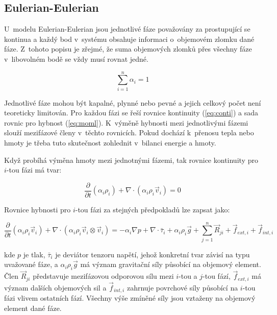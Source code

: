 \subsection{Eulerian-Eulerian}
U~modelu Eulerian-Eulerian jsou jednotlivé fáze považovány za prostupující se kontinua a každý bod v~systému obsahuje informaci o~objemovém zlomku dané fáze. Z~tohoto popisu je zřejmé, že suma objemových zlomků přes všechny fáze v~libovolném bodě se vždy musí rovnat jedné. 

\begin{equation}
	\sum_{i=1}^n \alpha_{i} = 1
	\label{eq:volfrac}
\end{equation} 

\noindent Jednotlivé fáze mohou být kapalné, plynné nebo pevné a jejich celkový počet není teoreticky limitován. Pro každou fázi se řeší rovnice kontinuity (\ref{eq:conti}) a sada rovnic pro hybnost (\ref{eq:moml}). K~výměně hybnosti mezi jednotlivými fázemi slouží mezifázové členy v~těchto rovnicích. Pokud dochází k~přenosu tepla nebo hmoty je třeba tuto skutečnost zohlednit v~bilanci energie a hmoty.    

Když probíhá výměna hmoty mezi jednotnými fázemi, tak rovnice kontinuity pro $i$-tou fázi má tvar:

\begin{equation}
	\frac{\partial}{\partial t} (\alpha_{i}\rho_{i}) +  \nabla \cdot (\alpha_{i}\rho_{i}\vec{v}_{i}) = 0
	\label{eq:conti}
\end{equation}

\noindent Rovnice hybnosti pro $i$-tou fázi za stejných předpokladů lze zapsat jako:

\begin{equation}
	\frac{\partial}{\partial t} (\alpha_{i}\rho_{i}\vec{v}_{i}) + \nabla \cdot (\alpha_{i}\rho_{i} \vec{v}_{i} \otimes \vec{v}_{i}) = -\alpha_{i} \nabla p + \nabla \cdot \bar{\tau}_{i} + \alpha_{i}\rho_{i}\vec{g} + \sum_{j=1}^n \vec{R}_{ji} + \vec{f}_{ext,i} + \vec{f}_{int,i}
	\label{eq:moml}
\end{equation}

\noindent kde $p$ je tlak, $\bar{\tau}_{i}$ je deviátor tenzoru napětí, jehož konkretní tvar závisí na typu uvažované fáze, a $\alpha_{i}\rho_{i}\vec{g}$ má význam gravitační síly působící na objemový element. Člen $\vec{R}_{ji}$ představuje mezifázovou odporovou sílu mezi $i$-tou a $j$-tou fází, $\vec{f}_{ext,i}$ má význam dalších objemových sil a $\vec{f}_{int,i}$ zahrnuje povrchové síly působící na $i$-tou fázi vlivem ostatních fází. Všechny výše zmíněné síly jsou vztaženy na objemový element dané fáze.

